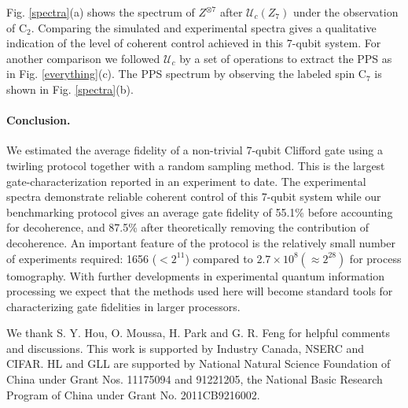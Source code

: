 \documentclass[prl,twocolumn,showpacs,superscriptaddress]{revtex4-1}
\begin{document}
 Fig. \ref{spectra}(a) shows the  spectrum of $Z^{\otimes 7}$  after  $\mathcal{U}_{c} (Z_7)$ under the observation of C$_2$. Comparing   the simulated and experimental spectra  gives a qualitative  indication of  the level of coherent control achieved in this 7-qubit system.  For another comparison we followed $\mathcal{U}_{c}$ by a set of  operations  to extract  the PPS as in Fig. \ref{everything}(c). The PPS spectrum by observing the labeled spin C$_7$ is shown in Fig. \ref{spectra}(b).

\paragraph*{Conclusion.}
We estimated  the average fidelity of a non-trivial 7-qubit Clifford gate using a twirling protocol together with a  random sampling method.  This is the largest gate-characterization reported in an experiment to date. The experimental spectra demonstrate reliable coherent control of this 7-qubit system while our benchmarking protocol gives an average gate fidelity of 55.1\% before accounting for decoherence, and 87.5\% after theoretically removing the contribution of decoherence. An important feature of the protocol is the relatively small number of experiments required: 1656 ($<2^{11}$) compared to $2.7 \times 10^8 (\approx2^{28})$ for process tomography. With further developments in experimental quantum information processing we expect that the methods used here will become standard tools for characterizing gate fidelities in larger processors.

We thank S. Y. Hou, O. Moussa, H. Park and G. R. Feng  for helpful comments and discussions. This work is supported by Industry Canada, NSERC and CIFAR. HL and GLL are supported by National Natural Science Foundation of China under Grant Nos. 11175094  and 91221205, the National Basic Research Program of China under Grant No. 2011CB9216002.
\end{document}
